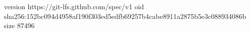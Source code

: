 version https://git-lfs.github.com/spec/v1
oid sha256:152bc094d4958af190f303ed5edfb69257b4cabe8911a2875b5e3c088934086b
size 87496
